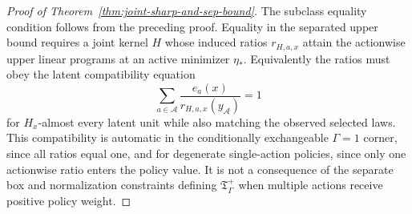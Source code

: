 \documentclass[11pt]{article}
\theoremstyle{definition}
\theoremstyle{plain}
\theoremstyle{remark}
\begin{document}
\begin{proof}[Proof of Theorem~\ref{thm:joint-sharp-and-sep-bound}]
The subclass equality condition follows from the preceding proof.  Equality in
the separated upper bound requires a joint kernel \(H\) whose induced ratios
\(r_{H,a,x}\) attain the actionwise upper linear programs at an active minimizer
\(\eta_*\).  Equivalently the ratios must obey the latent compatibility equation
\[
\sum_{a\in\mathcal A}\frac{e_a(x)}{r_{H,a,x}(y_{\mathcal A})}=1
\]
for \(H_x\)-almost every latent unit while also matching the observed selected
laws.  This compatibility is automatic in the conditionally exchangeable
\(\Gamma=1\) corner, since all ratios equal one, and for degenerate
single-action policies, since only one actionwise ratio enters the policy value.
It is not a consequence of the separate box and normalization constraints
defining \(\mathfrak T_\Gamma^+\) when multiple actions receive positive policy
weight.
\end{proof}
\end{document}
